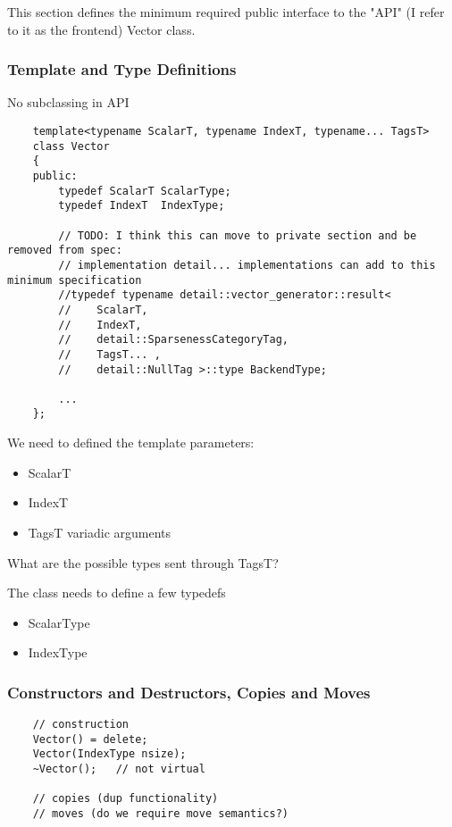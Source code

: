 This section defines the minimum required public interface to the "API" (I refer to it
as the frontend) Vector class.  

\subsubsection{Template and Type Definitions}

No subclassing in API

\begin{verbatim}
    template<typename ScalarT, typename IndexT, typename... TagsT>
    class Vector
    {
    public:
        typedef ScalarT ScalarType;
        typedef IndexT  IndexType;
        
        // TODO: I think this can move to private section and be removed from spec:
        // implementation detail... implementations can add to this minimum specification
        //typedef typename detail::vector_generator::result<
        //    ScalarT,
        //    IndexT,
        //    detail::SparsenessCategoryTag,
        //    TagsT... ,
        //    detail::NullTag >::type BackendType;

        ...
    };
\end{verbatim}

We need to defined the template parameters:
\begin{itemize}
\item ScalarT
\item IndexT
\item TagsT variadic arguments
\end{itemize}

What are the possible types sent through TagsT?

The class needs to define a few typedefs
\begin{itemize}
\item ScalarType
\item IndexType
\end{itemize}

\subsubsection{Constructors and Destructors, Copies and Moves}

\begin{verbatim}
    // construction
    Vector() = delete;
    Vector(IndexType nsize);
    ~Vector();   // not virtual
    
    // copies (dup functionality)
    // moves (do we require move semantics?)
\end{verbatim}

